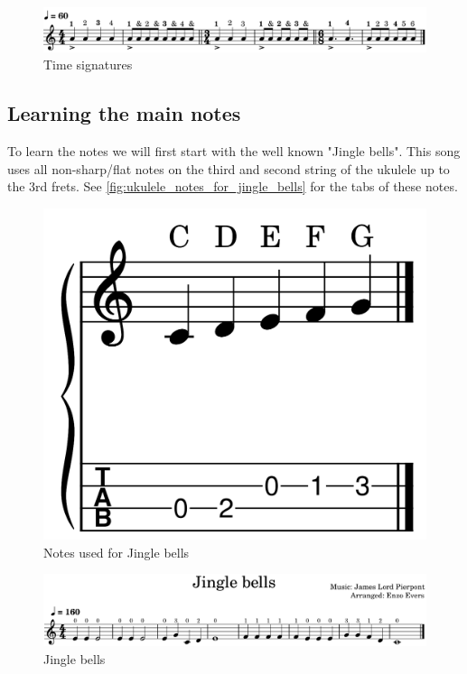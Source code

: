 \begin{figure}[h]
	\centering
	\includegraphics[width=\textwidth]{../../MuseScore/Ukulele/MusicNotation/TimeSignature.png}
	\caption{Time signatures}
	\label{fig:ukulele_time_signatures}
\end{figure}

\newpage

\subsection{Learning the main notes}

To learn the notes we will first start with the well known "Jingle bells". This song uses all non-sharp/flat notes on the third and second string of the ukulele up to the 3rd frets. See \autoref{fig:ukulele_notes_for_jingle_bells} for the tabs of these notes.

\begin{figure}[h]
	\centering
	\includegraphics[height=0.12\textheight]{../../MuseScore/Ukulele/UkuleleNotesInJingleBells.png}
	\caption{Notes used for Jingle bells}
	\label{fig:ukulele_notes_for_jingle_bells}
\end{figure}

\begin{figure}[h]
	\centering
	\includegraphics[width=\textwidth]{../../MuseScore/Ukulele/UkuleleJingleBells.png}
	\caption{Jingle bells}
	\label{fig:ukulele_jingle_bells}
\end{figure}

